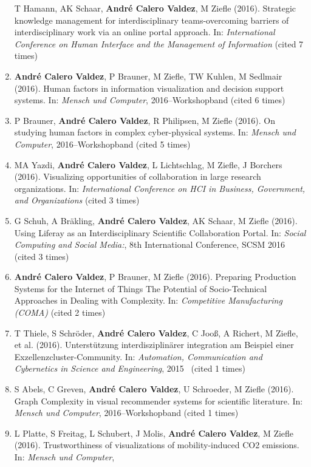\documentclass[11pt,a4paper,sans]{moderncv}
\begin{document}
\begin{enumerate}
  T Hamann, AK Schaar, \textbf{André Calero Valdez}, M Ziefle (2016).
  Strategic knowledge management for interdisciplinary teams-overcoming
  barriers of interdisciplinary work via an online portal approach. In:
  \emph{International Conference on Human Interface and the Management
  of Information} (cited 7 times)
\item
  \textbf{André Calero Valdez}, P Brauner, M Ziefle, TW Kuhlen, M
  Sedlmair (2016). Human factors in information visualization and
  decision support systems. In: \emph{Mensch und Computer},
  2016--Workshopband (cited 6 times)
\item
  P Brauner, \textbf{André Calero Valdez}, R Philipsen, M Ziefle (2016).
  On studying human factors in complex cyber-physical systems. In:
  \emph{Mensch und Computer}, 2016--Workshopband (cited 5 times)
\item
  MA Yazdi, \textbf{André Calero Valdez}, L Lichtschlag, M Ziefle, J
  Borchers (2016). Visualizing opportunities of collaboration in large
  research organizations. In: \emph{International Conference on HCI in
  Business, Government, and Organizations} (cited 3 times)
\item
  G Schuh, A Bräkling, \textbf{André Calero Valdez}, AK Schaar, M Ziefle
  (2016). Using Liferay as an Interdisciplinary Scientific Collaboration
  Portal. In: \emph{Social Computing and Social Media:}, 8th
  International Conference, SCSM 2016~ (cited 3 times)
\item
  \textbf{André Calero Valdez}, P Brauner, M Ziefle (2016). Preparing
  Production Systems for the Internet of Things The Potential of
  Socio-Technical Approaches in Dealing with Complexity. In:
  \emph{Competitive Manufacturing (COMA)} (cited 2 times)
\item
  T Thiele, S Schröder, \textbf{André Calero Valdez}, C Jooß, A Richert,
  M Ziefle, et al. (2016). Unterstützung interdisziplinärer integration
  am Beispiel einer Exzellenzcluster-Community. In: \emph{Automation,
  Communication and Cybernetics in Science and Engineering}, 2015~
  (cited 1 times)
\item
  S Abels, C Greven, \textbf{André Calero Valdez}, U Schroeder, M Ziefle
  (2016). Graph Complexity in visual recommender systems for scientific
  literature. In: \emph{Mensch und Computer}, 2016--Workshopband (cited
  1 times)
\item
  L Platte, S Freitag, L Schubert, J Molis, \textbf{André Calero
  Valdez}, M Ziefle (2016). Trustworthiness of visualizations of
  mobility-induced CO2 emissions. In: \emph{Mensch und Computer},

\end{enumerate}
\end{document}
